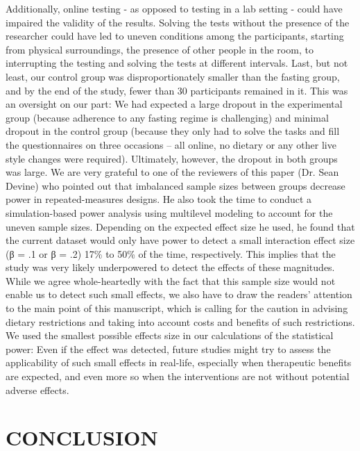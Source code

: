 \documentclass[authordate, empirical]{jote-new-article}
\begin{document}
Additionally, online testing - as opposed to testing in a lab setting - could have impaired the validity of the results. Solving the tests without the presence of the researcher could have led to uneven conditions among the participants, starting from physical surroundings, the presence of other people in the room, to interrupting the testing and solving the tests at different intervals. Last, but not least, our control group was disproportionately smaller than the fasting group, and by the end of the study, fewer than 30 participants remained in it. This was an oversight on our part: We had expected a large dropout in the experimental group (because adherence to any fasting regime is challenging) and minimal dropout in the control group (because they only had to solve the tasks and fill the questionnaires on three occasions -- all online, no dietary or any other live style changes were required). Ultimately, however, the dropout in both groups was large. We are very grateful to one of the reviewers of this paper (Dr. Sean Devine) who pointed out that imbalanced sample sizes between groups decrease power in repeated-measures designs. He also took the time to conduct a simulation-based power analysis using multilevel modeling to account for the uneven sample sizes. Depending on the expected effect size he used, he found that the current dataset would only have power to detect a small interaction effect size (β = .1 or β = .2) 17\% to 50\% of the time, respectively. This implies that the study was very likely underpowered to detect the effects of these magnitudes. While we agree whole-heartedly with the fact that this sample size would not enable us to detect such small effects, we also have to draw the readers' attention to the main point of this manuscript, which is calling for the caution in advising dietary restrictions and taking into account costs and benefits of such restrictions. We used the smallest possible effects size in our calculations of the statistical power: Even if the effect was detected, future studies might try to assess the applicability of such small effects in real-life, especially when therapeutic benefits are expected, and even more so when the interventions are not without potential adverse effects.



\section{CONCLUSION }
\end{document}
